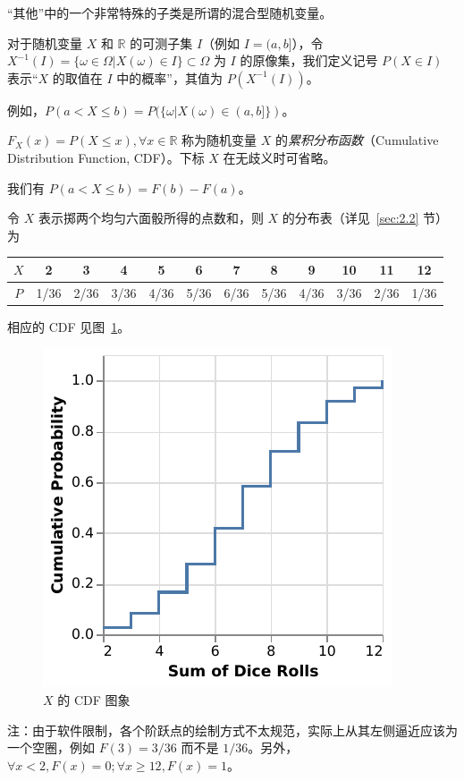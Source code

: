\documentclass[../main.tex]{subfiles}
\begin{document}
“其他”中的一个非常特殊的子类是所谓的混合型随机变量。

\begin{definition}\label{def:2.1.2}
  对于随机变量 $X$ 和 $\mathbb{R}$ 的可测子集 $I$（例如 $I=(a,b]$），令 $X^{-1}(I)=\{\omega\in\Omega|X(\omega)\in I\}\subset\Omega$ 为 $I$ 的原像集，我们定义记号 $P(X\in I)$ 表示“$X$ 的取值在 $I$ 中的概率”，其值为 $P(X^{-1}(I))$。
\end{definition}

例如，$P(a<X\leq b)=P(\{\omega|X(\omega)\in(a,b]\})$。

\begin{definition}\label{def:2.1.3}
  $F_X(x)=P(X\leq x),\forall x\in\mathbb{R}$ 称为随机变量 $X$ 的\emph{累积分布函数}（Cumulative Distribution Function, CDF）。下标 $X$ 在无歧义时可省略。
\end{definition}

我们有 $P(a<X\leq b)=F(b)-F(a)$。

\begin{example}
  令 $X$ 表示掷两个均匀六面骰所得的点数和，则 $X$ 的分布表（详见~\ref{sec:2.2} 节）为

  \bigskip
  \begin{tabular}{|c|c|c|c|c|c|c|c|c|c|c|c|}
    \hline
    $X$ & 2    & 3    & 4    & 5    & 6    & 7    & 8    & 9    & 10   & 11   & 12   \\
    \hline
    $P$ & 1/36 & 2/36 & 3/36 & 4/36 & 5/36 & 6/36 & 5/36 & 4/36 & 3/36 & 2/36 & 1/36 \\
    \hline
  \end{tabular}
  \bigskip

  相应的 CDF 见图~\ref{fig:2.1.1}。

  \begin{figure}[!h]
    \centering
    \includegraphics{figures/sum_2_dice_cdf.pdf}
    \caption{$X$ 的 CDF 图象}
    \label{fig:2.1.1}
  \end{figure}

  注：由于软件限制，各个阶跃点的绘制方式不太规范，实际上从其左侧逼近应该为一个空圈，例如 $F(3)=3/36$ 而不是 $1/36$。另外，$\forall x<2,F(x)=0;\forall x\geq 12,F(x)=1$。
\end{example}
\end{document}
